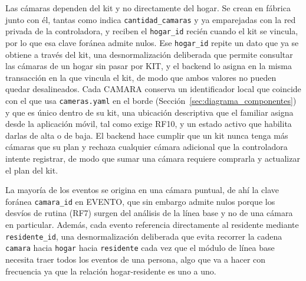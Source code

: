 Las cámaras dependen del kit y no directamente del hogar.
Se crean en fábrica junto con él, tantas como indica \texttt{cantidad\_camaras} y ya emparejadas con la red privada de la controladora, y reciben el \texttt{hogar\_id} recién cuando el kit se vincula, por lo que esa clave foránea admite nulos.
Ese \texttt{hogar\_id} repite un dato que ya se obtiene a través del kit, una desnormalización deliberada que permite consultar las cámaras de un hogar sin pasar por KIT, y el backend lo asigna en la misma transacción en la que vincula el kit, de modo que ambos valores no pueden quedar desalineados.
Cada CAMARA conserva un identificador local que coincide con el que usa \texttt{cameras.yaml} en el borde (Sección~\ref{sec:diagrama_componentes}) y que es único dentro de su kit, una ubicación descriptiva que el familiar asigna desde la aplicación móvil, tal como exige RF10, y un estado activo que habilita darlas de alta o de baja.
El backend hace cumplir que un kit nunca tenga más cámaras que su plan y rechaza cualquier cámara adicional que la controladora intente registrar, de modo que sumar una cámara requiere comprarla y actualizar el plan del kit.

La mayoría de los eventos se origina en una cámara puntual, de ahí la clave foránea \texttt{camara\_id} en EVENTO, que sin embargo admite nulos porque los desvíos de rutina (RF7) surgen del análisis de la línea base y no de una cámara en particular.
Además, cada evento referencia directamente al residente mediante \texttt{residente\_id}, una desnormalización deliberada que evita recorrer la cadena \texttt{camara} hacia \texttt{hogar} hacia \texttt{residente} cada vez que el módulo de línea base necesita traer todos los eventos de una persona, algo que va a hacer con frecuencia ya que la relación hogar-residente es uno a uno.

